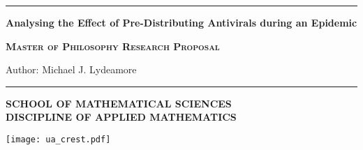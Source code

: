 \begin{titlepage}
\begin{flushleft} 
\hrule
\vspace{1 cm}
{\huge{\bf{Analysing the Effect of Pre-Distributing Antivirals during an Epidemic}}}

\textsc{\bf{Master of Philosophy Research Proposal}}

\vspace*{2cm}\vspace{2 cm}
{\large Author: Michael J. Lydeamore}

\vspace{3.5 cm}{\large Principal Supervisor: Professor Nigel Bean}

\vspace{0.3 cm}{\large Secondary Supervisosr: Dr Joshua V. Ross, Dr Andrew Black}

\vspace{2.5 cm}{\today}


\vspace{3 cm} \hrule
\end{flushleft}

\begin{flushleft}\textbf{\textsf{SCHOOL OF MATHEMATICAL SCIENCES\\ DISCIPLINE OF APPLIED MATHEMATICS}}\end{flushleft} \vspace{-1.5cm}
\begin{flushright} \texttt{[image: ua\_crest.pdf]}\end{flushright}\vspace{-2 cm}
\end{titlepage}

\tableofcontents